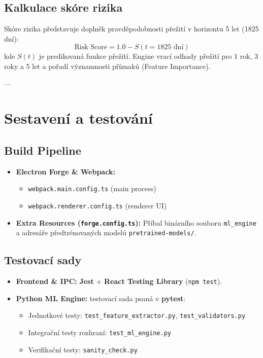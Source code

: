\documentclass[12pt,a4paper]{article}
\begin{document}
\subsection{Kalkulace skóre rizika}
Skóre rizika představuje doplněk pravděpodobnosti přežití v horizontu 5 let (1825 dní):
\begin{equation}
    \text{Risk Score} = 1.0 - S(t = 1825 \text{ dní})
\end{equation}
kde $S(t)$ je predikovaná funkce přežití. Engine vrací odhady přežití pro 1 rok, 3 roky a 5 let a pořadí významnosti příznaků (Feature Importance).

---

\section{Sestavení a testování}

\subsection{Build Pipeline}
\begin{itemize}
    \item \textbf{Electron Forge \& Webpack:}
    \begin{itemize}
        \item \texttt{webpack.main.config.ts} (main process)
        \item \texttt{webpack.renderer.config.ts} (renderer UI)
    \end{itemize}
    \item \textbf{Extra Resources (\texttt{forge.config.ts}):} Příbal binárního souboru \texttt{ml\_engine} a adresáře předtrénovaných modelů \texttt{pretrained-models/}.
\end{itemize}

\subsection{Testovací sady}
\begin{itemize}
    \item \textbf{Frontend \& IPC:} \textbf{Jest} + \textbf{React Testing Library} (\texttt{npm test}).
    \item \textbf{Python ML Engine:} testovací sada psaná v \textbf{pytest}:
    \begin{itemize}
        \item Jednotkové testy: \texttt{test\_feature\_extractor.py}, \texttt{test\_validators.py}
        \item Integrační testy rozhraní: \texttt{test\_ml\_engine.py}
        \item Verifikační testy: \texttt{sanity\_check.py}
    \end{itemize}
\end{itemize}
\end{document}
